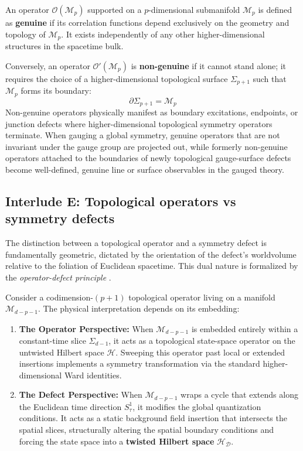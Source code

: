 \documentclass[aps,preprint,nofootinbib,preprintnumbers,eqsecnum,superscriptaddress]{revtex4}
\numberwithin{equation}{section}
\begin{document}
An operator $\mathcal{O}(\mathcal{M}_p)$ supported on a $p$-dimensional submanifold $\mathcal{M}_p$ is defined as \textbf{genuine} if its correlation functions depend exclusively on the geometry and topology of $\mathcal{M}_p$. It exists independently of any other higher-dimensional structures in the spacetime bulk. 

Conversely, an operator $\mathcal{O}'(\mathcal{M}_p)$ is \textbf{non-genuine} if it cannot stand alone; it requires the choice of a higher-dimensional topological surface $\Sigma_{p+1}$ such that $\mathcal{M}_p$ forms its boundary:
\begin{equation}
    \partial \Sigma_{p+1} = \mathcal{M}_p
\end{equation}
Non-genuine operators physically manifest as boundary excitations, endpoints, or junction defects where higher-dimensional topological symmetry operators terminate. When gauging a global symmetry, genuine operators that are not invariant under the gauge group are projected out, while formerly non-genuine operators attached to the boundaries of newly topological gauge-surface defects become well-defined, genuine line or surface observables in the gauged theory.

\subsection{Interlude E: Topological operators vs symmetry defects} 
\label{sec:topo_op-vs-symm_op}

The distinction between a topological operator and a symmetry defect is fundamentally geometric, dictated by the orientation of the defect's worldvolume relative to the foliation of Euclidean spacetime. This dual nature is formalized by the \textit{operator-defect principle} \cite{shao2024whatsundonetasilectures}.

Consider a codimension-$(p+1)$ topological operator living on a manifold $\mathcal{M}_{d-p-1}$. The physical interpretation depends on its embedding:
\begin{enumerate}[\itshape i)]
    \item \textbf{The Operator Perspective:} When $\mathcal{M}_{d-p-1}$ is embedded entirely within a constant-time slice $\Sigma_{d-1}$, it acts as a topological state-space operator on the untwisted Hilbert space $\mathcal{H}$. Sweeping this operator past local or extended insertions implements a symmetry transformation via the standard higher-dimensional Ward identities.
    \item \textbf{The Defect Perspective:} When $\mathcal{M}_{d-p-1}$ wraps a cycle that extends along the Euclidean time direction $S^1_\tau$, it modifies the global quantization conditions. It acts as a static background field insertion that intersects the spatial slices, structurally altering the spatial boundary conditions and forcing the state space into a \textbf{twisted Hilbert space} $\mathcal{H}_{\mathcal{D}}$.
\end{enumerate}
\end{document}

